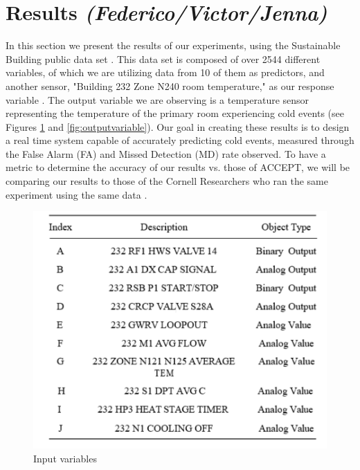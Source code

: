 \documentclass{acm_proc_article-sp}
\begin{document}
\section{Results \textit{(Federico/Victor/Jenna)}}
In this section we present the results of our experiments, using the Sustainable Building public data set \cite{sbdata}. This data set is composed of over 2544 different variables, of which we are utilizing data from 10 of them as predictors, and another sensor, "Building 232 Zone N240 room temperature," as our response variable \cite{Cornell}. The output variable we are observing is a temperature sensor representing the temperature of the primary room experiencing cold events (see Figures \ref{fig:inputvariables} and \ref{fig:outputvariable}). Our goal in creating these results is to design a real time system capable of accurately predicting cold events, measured through the False Alarm (FA) and Missed Detection (MD) rate observed. To have a metric to determine the accuracy of our results vs. those of ACCEPT, we will be comparing our results to those of the Cornell Researchers who ran the same experiment using the same data \cite{Cornell}.

\begin{figure}[!h]
\centering
    \includegraphics[scale=0.25]{figures/input_variables.png}
\caption{Input variables} 
\label{fig:inputvariables}
\end{figure}
\end{document}
